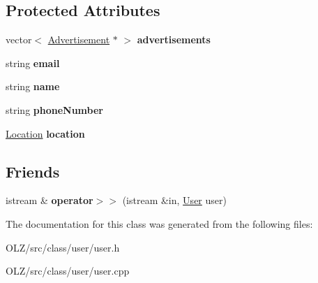 \subsection*{Protected Attributes}
\begin{DoxyCompactItemize}
\item 
\hypertarget{class_user_a9a78e0f9ab50c5d9d3041d1d90acd4d8}{}vector$<$ \hyperlink{class_advertisement}{Advertisement} $\ast$ $>$ {\bfseries advertisements}\label{class_user_a9a78e0f9ab50c5d9d3041d1d90acd4d8}

\item 
\hypertarget{class_user_a2d678acd22b533660b4b7d8404961f14}{}string {\bfseries email}\label{class_user_a2d678acd22b533660b4b7d8404961f14}

\item 
\hypertarget{class_user_a643f85779a4693855c171c396f49e515}{}string {\bfseries name}\label{class_user_a643f85779a4693855c171c396f49e515}

\item 
\hypertarget{class_user_a727ba647fe019be6fa9c03308d60da9e}{}string {\bfseries phone\+Number}\label{class_user_a727ba647fe019be6fa9c03308d60da9e}

\item 
\hypertarget{class_user_a1c8e68a346c8a47d8cf0e75356c66562}{}\hyperlink{class_location}{Location} {\bfseries location}\label{class_user_a1c8e68a346c8a47d8cf0e75356c66562}

\end{DoxyCompactItemize}
\subsection*{Friends}
\begin{DoxyCompactItemize}
\item 
\hypertarget{class_user_a450594b5d214c6f0e33a61a070d77422}{}istream \& {\bfseries operator$>$$>$} (istream \&in, \hyperlink{class_user}{User} user)\label{class_user_a450594b5d214c6f0e33a61a070d77422}

\end{DoxyCompactItemize}


The documentation for this class was generated from the following files\+:\begin{DoxyCompactItemize}
\item 
O\+L\+Z/src/class/user/user.\+h\item 
O\+L\+Z/src/class/user/user.\+cpp\end{DoxyCompactItemize}

